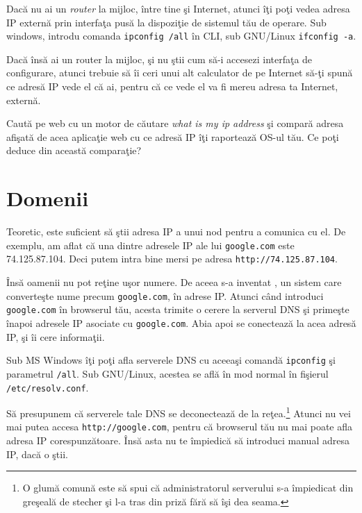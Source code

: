 
Dacă nu ai un \textsl{router} la mijloc, între tine şi Internet, atunci îţi poţi vedea adresa IP
externă prin interfaţa pusă la dispoziţie de sistemul tău de operare. Sub windows, introdu
comanda \texttt{ipconfig /all} în CLI, sub GNU/Linux \texttt{ifconfig -a}.

Dacă însă ai un router la mijloc, şi nu ştii cum să-i accesezi interfaţa de configurare,
atunci trebuie să îi ceri unui alt calculator de pe Internet să-ţi spună ce adresă IP
vede el că ai, pentru că ce vede el va fi mereu adresa ta Internet, externă.

\begin{Exercise}[title={What is my IP Address?},difficulty=1]
Caută pe web cu un motor de căutare \textit{what is my ip address} şi compară
adresa afişată de acea aplicaţie web cu ce adresă IP îţi raportează OS-ul tău.
Ce poţi deduce din această comparaţie?
\end{Exercise}

\section{Domenii}
Teoretic, este suficient să ştii adresa IP a unui nod pentru a comunica cu el. De exemplu,
am aflat că una dintre adresele IP ale lui \texttt{google.com} este 74.125.87.104. Deci putem
intra bine mersi pe adresa \texttt{http://74.125.87.104}.

Însă oamenii nu pot reţine uşor numere. De aceea s-a inventat ,
un sistem care converteşte nume precum \texttt{google.com}, în adrese IP. Atunci când introduci
\texttt{google.com} în browserul tău, acesta trimite o cerere la serverul DNS şi primeşte
înapoi adresele IP asociate cu \texttt{google.com}. Abia apoi se conectează la acea adresă IP,
şi îi cere informaţii.

Sub MS Windows îţi poţi afla serverele DNS cu aceeaşi comandă \texttt{ipconfig} şi parametrul
\texttt{/all}. Sub GNU/Linux, acestea se află în mod normal în fişierul \texttt{/etc/resolv.conf}.

Să presupunem că serverele tale DNS se deconectează de la reţea.\footnote{O glumă
comună este să spui că administratorul serverului s-a împiedicat din greşeală de stecher
şi l-a tras din priză fără să îşi dea seama.} Atunci nu vei mai putea accesa \texttt{http://google.com},
pentru că browserul tău nu mai poate afla adresa IP corespunzătoare. Însă asta nu te împiedică
să introduci manual adresa IP, dacă o ştii.

